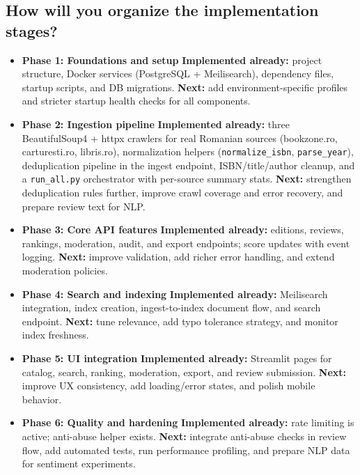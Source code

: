 \documentclass[12pt,a4paper]{article}
\begin{document}
\subsection{How will you organize the implementation stages?}
\begin{itemize}[leftmargin=*]
	\item \textbf{Phase 1: Foundations and setup}
	\textbf{Implemented already:} project structure, Docker services (PostgreSQL + Meilisearch), dependency files, startup scripts, and DB migrations.
	\textbf{Next:} add environment-specific profiles and stricter startup health checks for all components.

	\item \textbf{Phase 2: Ingestion pipeline}
	\textbf{Implemented already:} three BeautifulSoup4 + httpx crawlers for real Romanian sources (bookzone.ro, carturesti.ro, libris.ro), normalization helpers (\texttt{normalize\_isbn}, \texttt{parse\_year}), deduplication pipeline in the ingest endpoint, ISBN/title/author cleanup, and a \texttt{run\_all.py} orchestrator with per-source summary stats.
	\textbf{Next:} strengthen deduplication rules further, improve crawl coverage and error recovery, and prepare review text for NLP.

	\item \textbf{Phase 3: Core API features}
	\textbf{Implemented already:} editions, reviews, rankings, moderation, audit, and export endpoints; score updates with event logging.
	\textbf{Next:} improve validation, add richer error handling, and extend moderation policies.

	\item \textbf{Phase 4: Search and indexing}
	\textbf{Implemented already:} Meilisearch integration, index creation, ingest-to-index document flow, and search endpoint.
	\textbf{Next:} tune relevance, add typo tolerance strategy, and monitor index freshness.

	\item \textbf{Phase 5: UI integration}
	\textbf{Implemented already:} Streamlit pages for catalog, search, ranking, moderation, export, and review submission.
	\textbf{Next:} improve UX consistency, add loading/error states, and polish mobile behavior.

	\item \textbf{Phase 6: Quality and hardening}
	\textbf{Implemented already:} rate limiting is active; anti-abuse helper exists.
	\textbf{Next:} integrate anti-abuse checks in review flow, add automated tests, run performance profiling, and prepare NLP data for sentiment experiments.


\end{itemize}
\end{document}
